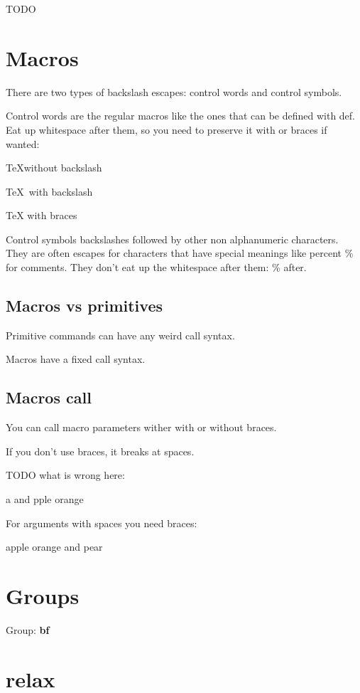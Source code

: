   TODO

\section{Macros}

  There are two types of backslash escapes: control words and control symbols.

  Control words are the regular macros like the ones that can be defined with \bs def. Eat up whitespace after them, so you need to preserve it with \bs or braces if wanted:

  \TeX without backslash

  \TeX\ with backslash

  \TeX{} with braces

  Control symbols backslashes followed by other non alphanumeric characters. They are often escapes for characters that have special meanings like percent \% for comments. They don't eat up the whitespace after them: \% after.

  \subsection{Macros vs primitives}

    Primitive commands can have any weird call syntax.

    Macros have a fixed call syntax.

  \subsection{Macros call}

    You can call macro parameters wither with or without braces.

    If you don't use braces, it breaks at spaces.

    \def\f#1#2{#1 and #2}

    TODO what is wrong here:

    \f apple orange

    For arguments with spaces you need braces:

    \f{apple orange}{pear}

\section{Groups}

  Group: {\bf bf}

\section{relax}

